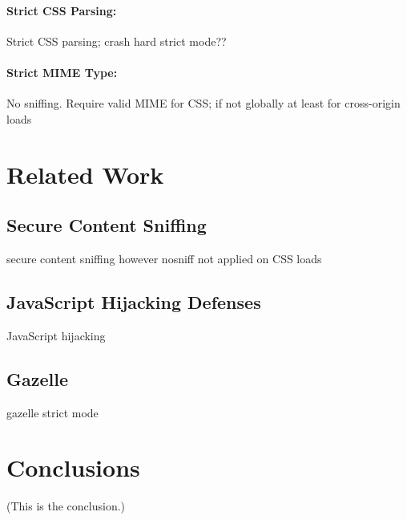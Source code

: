\documentclass{acm_proc_article-sp}
\begin{document}
\paragraph{Strict CSS Parsing:}
Strict CSS parsing;
crash hard
strict mode??

\paragraph{Strict MIME Type:}
No sniffing. Require valid MIME for CSS; if not globally at least for cross-origin loads


\section{Related Work}

\subsection{Secure Content Sniffing}
secure content sniffing\cite{securecontentsniffing}
however nosniff not applied on CSS loads

\subsection{JavaScript Hijacking Defenses}
JavaScript hijacking\cite{jshijacking}

\subsection{Gazelle}
gazelle\cite{gazelle}
strict mode

\section{Conclusions}
(This is the conclusion.)



\end{document}
